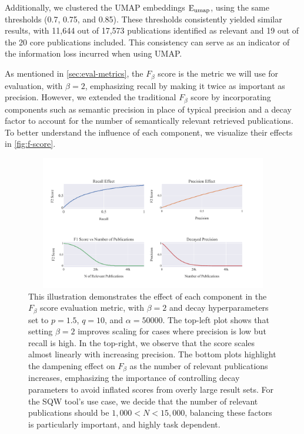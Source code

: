 Additionally, we clustered the UMAP embeddings $\mathop{}\!\mathrm{E_{umap}}$, using the same thresholds (0.7, 0.75, and 0.85). These thresholds consistently yielded similar results, with 11,644 out of 17,573 publications identified as relevant and 19 out of the 20 core publications included. This consistency can serve as an indicator of the information loss incurred when using UMAP.

As mentioned in \autoref{sec:eval-metrics}, the $F_{\beta}$ score is the metric we will use for evaluation, with $\beta=2$, emphasizing recall by making it twice as important as precision. However, we extended the traditional $F_{\beta}$ score by incorporating components such as semantic precision in place of typical precision and a decay factor to account for the number of semantically relevant retrieved publications. To better understand the influence of each component, we visualize their effects in \autoref{fig:f-score}.

\begin{figure}[!t]
	\hspace*{-1cm}
	\includegraphics[width=450px, height=220px]{pics/f_score.pdf}
	\caption[$F_{\beta}$ Components Analysis]{This illustration demonstrates the effect of each component in the $F_{\beta}$ score evaluation metric, with $\beta=2$ and decay hyperparameters set to $p=1.5$, $q=10$, and $\alpha=50000$. The top-left plot shows that setting $\beta=2$ improves scaling for cases where precision is low but recall is high. In the top-right, we observe that the score scales almost linearly with increasing precision. The bottom plots highlight the dampening effect on $F_{\beta}$ as the number of relevant publications increases, emphasizing the importance of controlling decay parameters to avoid inflated scores from overly large result sets. For the SQW tool's use case, we decide that the number of relevant publications should be $1,000 < N < 15,000$, balancing these factors is particularly important, and highly task dependent.}\label{fig:f-score}
\end{figure}


